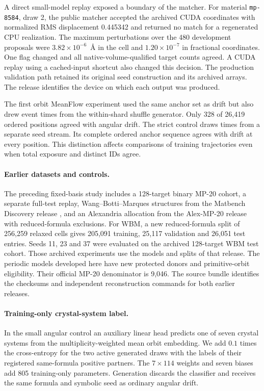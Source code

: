 A direct small-model replay exposed a boundary of the matcher. For material \texttt{mp-8584}, draw 2, the public matcher accepted the archived CUDA coordinates with normalized RMS displacement 0.445342 and returned no match for a regenerated CPU realization. The maximum perturbations over the 480 development proposals were $3.82\times10^{-6}$~\AA{} in the cell and $1.20\times10^{-7}$ in fractional coordinates. One flag changed and all native-volume-qualified target counts agreed. A CUDA replay using a cached-input shortcut also changed this decision. The production validation path retained its original seed construction and its archived arrays. The release identifies the device on which each output was produced.

The first orbit MeanFlow experiment used the same anchor set as drift but also drew event times from the within-shard shuffle generator. Only 328 of 26,419 ordered positions agreed with angular drift. The strict control draws times from a separate seed stream. Its complete ordered anchor sequence agrees with drift at every position. This distinction affects comparisons of training trajectories even when total exposure and distinct IDs agree.

\paragraph{Earlier datasets and controls.} The preceding fixed-basis study includes a 128-target binary MP-20 cohort, a separate full-test replay, Wang--Botti--Marques structures from the Matbench Discovery release \cite{wbm,matbench}, and an Alexandria allocation from the Alex-MP-20 release \cite{mattergen} with reduced-formula exclusions. For WBM, a new reduced-formula split of 256,259 relaxed cells gives 205,091 training, 25,117 validation and 26,051 test entries. Seeds 11, 23 and 37 were evaluated on the archived 128-target WBM test cohort. Those archived experiments use the models and splits of that release. The periodic models developed here have new protected donors and primitive-orbit eligibility. Their official MP-20 denominator is 9,046. The source bundle identifies the checksums and independent reconstruction commands for both earlier releases.

\paragraph{Training-only crystal-system label.} In the small angular control an auxiliary linear head predicts one of seven crystal systems from the multiplicity-weighted mean orbit embedding. We add $0.1$ times the cross-entropy for the two active generated draws with the labels of their registered same-formula positive partners. The $7\times 114$ weights and seven biases add 805 training-only parameters. Generation discards the classifier and receives the same formula and symbolic seed as ordinary angular drift.

